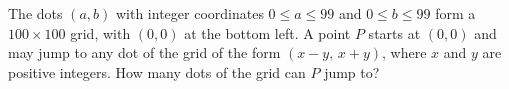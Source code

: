 The dots $(a,b)$ with integer coordinates $0\le a\le99$ and $0\le b\le99$ form a $100\times100$ grid, with $(0,0)$ at the bottom left. A point $P$ starts at $(0,0)$ and may jump to any dot of the grid of the form $(x-y,\,x+y)$, where $x$ and $y$ are positive integers. How many dots of the grid can $P$ jump to?
